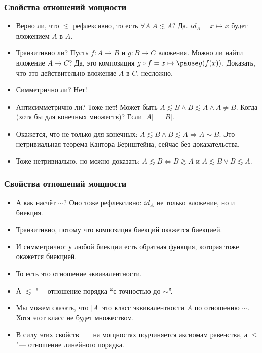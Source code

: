 \documentclass[10pt]{beamer}
\begin{document}
\begin{frame}
    \frametitle{Свойства отношений мощности}
    \begin{itemize}
        \item Верно ли, что $\lesssim$ рефлексивно, то есть \pause $\forall A~A \lesssim A$? \pause Да. $id_A = x \mapsto x$ будет вложением $A$ в $A$.
        \item Транзитивно ли? Пусть $f: A \to B$ и $g: B \to C$ вложения. Можно ли найти вложение $A \to C$? \pause Да, это композиция $g \circ f = x \mapsto \pause g(f(x))$. Доказать, что это действительно вложение $A$ в $C$, несложно.
        \item Симметрично ли? \pause Нет!
        \item Антисимметрично ли? \pause Тоже нет! Может быть $A \lesssim B \land B \lesssim A \land A \neq B$. Когда (хотя бы для конечных множеств)? \pause Если $|A| = |B|$.
        \item Окажется, что не только для конечных: $A \lesssim B \land B \lesssim A \Rightarrow A \sim B$. Это нетривиальная теорема Кантора-Бернштейна, сейчас без доказательства.
        \item Тоже нетривиально, но можно доказать: $A \lesssim B \Leftrightarrow B \gtrsim A$ и $A \lesssim B \lor B \lesssim A$.
    \end{itemize}
\end{frame}

\begin{frame}
    \frametitle{Свойства отношений мощности}
    \begin{itemize}
        \item А как насчёт $\sim$? Оно тоже рефлексивно: $id_A$ не только вложение, но и \pause биекция.
        \pause
        \item Транзитивно, потому что \pause композиция биекций окажется биекцией.
        \pause
        \item И симметрично: у любой биекции есть \pause обратная функция, которая тоже окажется биекцией.
        \pause
        \item То есть это отношение \pause эквивалентности.
        \item А $\lesssim$ "--- отношение порядка \enquote{с точностью до $\sim$}.
        \pause
        \item Мы можем сказать, что $|A|$ это класс эквивалентности $A$ по отношению $\sim$. \pause Хотя этот класс не будет множеством. \pause
        \item В силу этих свойств $=$ на мощностях подчиняется аксиомам равенства, а $\leq$ "--- отношение линейного порядка.
    \end{itemize}
\end{frame}
\end{document}

